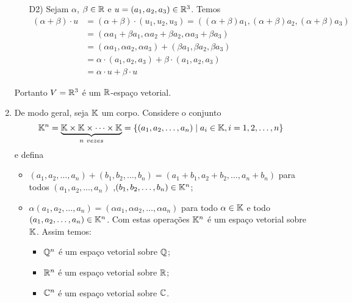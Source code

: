 \begin{exemplo}
\begin{enumerate}[label={\arabic*})]
\begin{solucao}
\begin{enumerate}
              \item[D2)] Sejam $\alpha$, $\beta \in \mathbb{R}$ e $u = (a_1, a_2, a_3) \in \mathbb{R}^3$. Temos
                \begin{align*}
                  (\alpha + \beta)\cdot u & = (\alpha + \beta)\cdot(u_1, u_2, u_ 3) = ((\alpha + \beta)a_1, (\alpha + \beta)a_2, (\alpha + \beta)a_3) \\ &= (\alpha a_1 + \beta a_1, \alpha a_2 + \beta a_2, \alpha a_3 + \beta a_3) \\ &= (\alpha a_1, \alpha a_2, \alpha a_3) + (\beta a_1, \beta a_2, \beta a_3) \\ &= \alpha\cdot(a_1, a_2, a_3) + \beta\cdot(a_1, a_2, a_3) \\ &= \alpha\cdot u + \beta\cdot u
                \end{align*}
            \end{enumerate}
            Portanto $V = \mathbb{R}^3$ é um $\mathbb{R}$-espaço vetorial.
          \end{solucao}

    \item De modo geral, seja $\mathbb{K}$ um corpo. Considere o conjunto
          \[
            \mathbb{K}^n = \underbrace{\mathbb{K} \times \mathbb{K} \times \cdots \times \mathbb{K}}_{n\ vezes} = \{(a_1, a_2,\dots,a_n) \mid a_i \in \mathbb{K}, i =1, 2, \dots, n\}
          \]
          e defina
          \begin{itemize}
            \item $(a_1, a_2, \dots, a_n) + (b_1, b_2, \dots,b_n) = (a_1 + b_1, a_2 + b_2,\dots, a_n + b_n)$ para todos $(a_1, a_2, \dots,a_n)$ ,$(b_1, b_2, \dots,b_n) \in \mathbb{K}^n$;
            \item $\alpha (a_1, a_2, \dots,a_n) = (\alpha a_1, \alpha a_2, \dots, \alpha a_n)$ para todo $\alpha \in \mathbb{K}$ e todo $(a_1, a_2, \dots, a_n) \in \mathbb{K}^n$.
                  Com estas operações $\mathbb{K}^n$ é um espaço vetorial sobre $\mathbb{K}$. Assim temos:
                  \begin{itemize}
                    \item $\mathbb{Q}^n$ é um espaço vetorial sobre $\mathbb{Q}$;
                    \item $\mathbb{R}^n$ é um espaço vetorial sobre $\mathbb{R}$;
                    \item $\mathbb{C}^n$ é um espaço vetorial sobre $\mathbb{C}$.
                  \end{itemize}
          \end{itemize}


\end{enumerate}
\end{exemplo}

